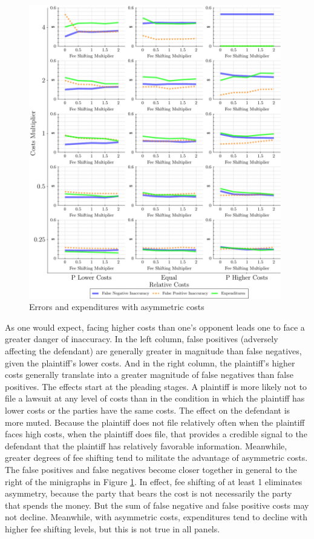\documentclass{article}
\begin{document}
\begin{figure}
\begin{minipage}{0.48\textwidth}
        \includegraphics[width=0.98\textwidth, scale=0.70, trim={0in 0in 0in 0in}, clip]{../Figures/Accuracy and Expenditures Varying Relative Costs} %
        \caption{Errors and expenditures with asymmetric costs}
		\label{fig:accexp_costsasymmetry}
    \end{minipage}
\end{figure}

As one would expect, facing higher costs than one's opponent leads one to face a greater danger of inaccuracy. In the left column, false positives (adversely affecting the defendant) are generally greater in magnitude than false negatives, given the plaintiff's lower costs. And in the right column, the plaintiff's higher costs generally translate into a greater magnitude of false negatives than false positives. The effects start at the pleading stages. A plaintiff is more likely not to file a lawsuit at any level of costs than in the condition in which the plaintiff has lower costs or the parties have the same costs. The effect on the defendant is more muted. Because the plaintiff does not file relatively often when the plaintiff faces high costs, when the plaintiff does file, that provides a credible signal to the defendant that the plaintiff has relatively favorable information. Meanwhile, greater degrees of fee shifting tend to militate the advantage of asymmetric costs. The false positives and false negatives become closer together in general to the right of the minigraphs in Figure \ref{fig:accexp_costsasymmetry}. In effect, fee shifting of at least 1 eliminates asymmetry, because the party that bears the cost is not necessarily the party that spends the money. But the sum of false negative and false positive costs may not decline.  Meanwhile, with asymmetric costs, expenditures tend to decline with higher fee shifting levels, but this is not true in all panels.
\end{document}

